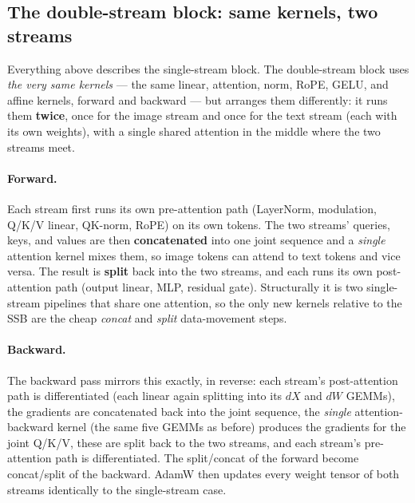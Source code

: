 \documentclass[11pt]{report}
\begin{document}
\subsection{The double-stream block: same kernels, two streams}
\label{sec:dsb-kernels}

Everything above describes the single-stream block. The double-stream
block uses \emph{the very same kernels} --- the same linear, attention,
norm, RoPE, GELU, and affine kernels, forward and backward --- but arranges
them differently: it runs them \textbf{twice}, once for the image stream
and once for the text stream (each with its own weights), with a single
shared attention in the middle where the two streams meet.

\paragraph{Forward.} Each stream first runs its own pre-attention path
(LayerNorm, modulation, Q/K/V linear, QK-norm, RoPE) on its own tokens.
The two streams' queries, keys, and values are then \textbf{concatenated}
into one joint sequence and a \emph{single} attention kernel mixes them, so
image tokens can attend to text tokens and vice versa. The result is
\textbf{split} back into the two streams, and each runs its own
post-attention path (output linear, MLP, residual gate). Structurally it is
two single-stream pipelines that share one attention, so the only new
kernels relative to the SSB are the cheap \emph{concat} and \emph{split}
data-movement steps.

\paragraph{Backward.} The backward pass mirrors this exactly, in reverse:
each stream's post-attention path is differentiated (each linear again
splitting into its $dX$ and $dW$ GEMMs), the gradients are concatenated
back into the joint sequence, the \emph{single} attention-backward kernel
(the same five GEMMs as before) produces the gradients for the joint Q/K/V,
these are split back to the two streams, and each stream's pre-attention
path is differentiated. The split/concat of the forward become
concat/split of the backward. AdamW then updates every weight tensor of
both streams identically to the single-stream case.
\end{document}
